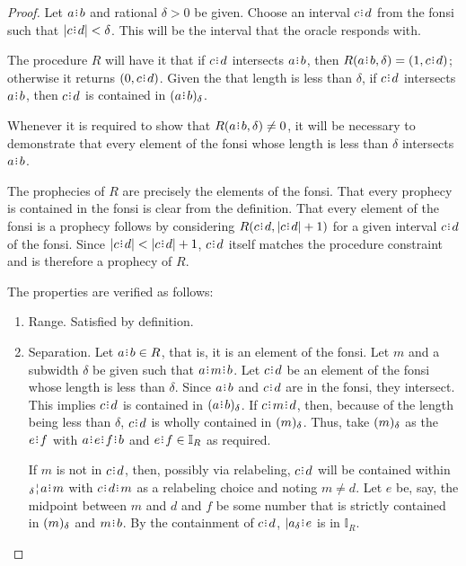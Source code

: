 \documentclass[12pt]{article}
\begin{document}
\begin{proof}
    Let $a\rint b$ and rational $\delta>0$ be given. Choose an interval $c\rint d$ from the fonsi such that $|c\rint d| < \delta$. This will be the interval that the oracle responds with. 

    The procedure $R$ will have it that if $c\rint d$ intersects $a\rint b$, then $R(a\rint b, \delta) = (1, c\rint d)$; otherwise it returns $(0, c \rint d)$.  Given the that length is less than $\delta$, if $c\rint d$ intersects $a\rint b$, then  $c\rint d$ is contained in $\halo{a\rint b}$.

    Whenever it is required to show that $R(a\rint b, \delta) \neq 0$, it will be necessary to demonstrate that every element of the fonsi whose length is less than $\delta$ intersects $a\rint b$. 
    
    The prophecies of $R$ are precisely the elements of the fonsi. That every prophecy is contained in the fonsi is clear from the definition. That every element of the fonsi is a prophecy follows by considering $R(c\rint d, |c\rint d|+1)$ for a given interval $c\rint d$ of the fonsi. Since $|c\rint d| < |c\rint d|+1$, $c\rint d$ itself matches the procedure constraint and is therefore a prophecy of $R$. 

    The properties are verified as follows:  
    \begin{enumerate}
        \item Range. Satisfied by definition. 
        \item Separation. 
        Let $a\rint b \in R$, that is, it is an element of the fonsi. Let $m$ and a subwidth $\delta$ be given such that $a\rint m\rint b$. Let $c\rint d$ be an element of the fonsi whose length is less than $\delta$. Since $a\rint b$ and $c\rint d$ are in the fonsi, they intersect. This implies $c\rint d$ is contained in $\halo{a\rint b}$. If $c\rint m\rint d$, then, because of the length being less than $\delta$, $c\rint d$ is wholly contained in $(m)_{\delta}$. Thus, take $(m)_{\delta}$ as the $e\rint f$ with $a\rint e\rint f\rint b$ and $e\rint f \in \mathbb{I}_{R}$ as required. 
        
        If $m$ is not in $c\rint d$, then, possibly via relabeling, $c\rint d$ will be contained within $\fuzbleft{a} \rint m$ with $c\rint d\rint m$ as a relabeling choice and noting $m \neq d$. Let $e$ be, say, the midpoint between $m$ and $d$ and $f$ be some number that is strictly contained in $(m)_{\delta}$ and $m\rint b$. By the containment of $c\rint d$, $|a_\delta\rint e$ is in $\mathbb{I}_R$.
        

\end{enumerate}
\end{proof}
\end{document}
